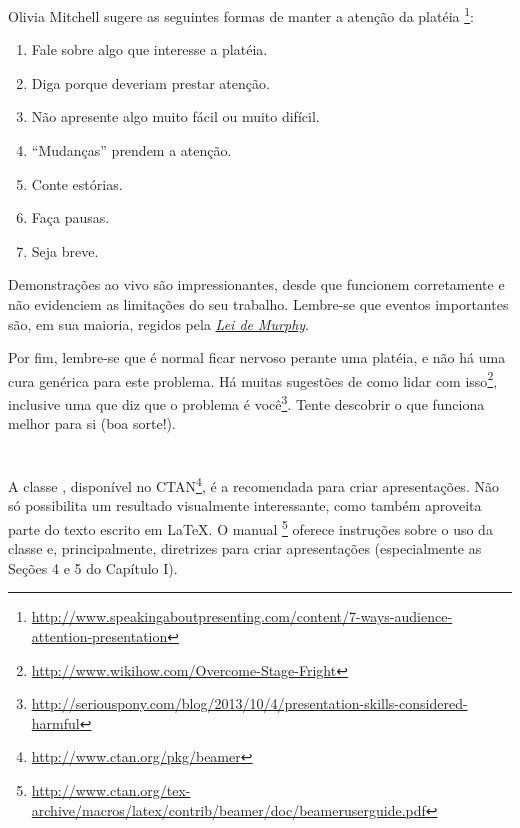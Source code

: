 Olivia Mitchell sugere as seguintes formas de manter a atenção da platéia%
\footnote{\url{http://www.speakingaboutpresenting.com/content/7-ways-audience-attention-presentation}}:
\begin{enumerate}
\item Fale sobre algo que interesse a platéia.
\item Diga porque deveriam prestar atenção.
\item Não apresente algo muito fácil ou muito difícil.
\item ``Mudanças'' prendem a atenção.
\item Conte estórias.
\item Faça pausas.
\item Seja breve.
\end{enumerate}

Demonstrações ao vivo são impressionantes, desde que funcionem corretamente e não
evidenciem as limitações do seu trabalho. Lembre-se que eventos importantes são,
em sua maioria, regidos pela \emph{\href{http://www.humornaciencia.com.br/miscelanea/murphy.htm}{Lei de Murphy}}.%

Por fim, lembre-se que é normal ficar nervoso perante uma platéia, e não há uma
cura genérica para este problema. Há muitas sugestões de como lidar com isso\footnote{\url{http://www.wikihow.com/Overcome-Stage-Fright}},
inclusive uma que diz que o problema é você\footnote{\url{http://seriouspony.com/blog/2013/10/4/presentation-skills-considered-harmful}}.
Tente descobrir o que funciona melhor para si (boa sorte!).

\newcommand{\beamer}{{}}%
\section{\beamer}
A classe \beamer, disponível no \acrshort{CTAN}\footnote{\url{http://www.ctan.org/pkg/beamer}},
é a recomendada para criar apresentações. Não só possibilita um resultado visualmente
interessante, como também aproveita parte do texto escrito em \LaTeX. O manual%
\footnote{\url{http://www.ctan.org/tex-archive/macros/latex/contrib/beamer/doc/beameruserguide.pdf}}
oferece instruções sobre o uso da classe e, principalmente, diretrizes para criar
apresentações (especialmente as Seções 4 e 5 do Capítulo I).